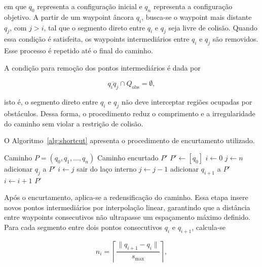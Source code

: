 em que $q_0$ representa a configuração inicial e $q_n$ representa a configuração objetivo. A partir de um waypoint âncora $q_i$, busca-se o waypoint mais distante $q_j$, com $j > i$, tal que o segmento direto entre $q_i$ e $q_j$ seja livre de colisão. Quando essa condição é satisfeita, os waypoints intermediários entre $q_i$ e $q_j$ são removidos. Esse processo é repetido até o final do caminho.

A condição para remoção dos pontos intermediários é dada por

\begin{equation}
    \overline{q_iq_j} \cap Q_{\mathrm{obs}} = \emptyset,
    \label{eq:shortcut_collision_free}
\end{equation}

isto é, o segmento direto entre $q_i$ e $q_j$ não deve interceptar regiões ocupadas por obstáculos. Dessa forma, o procedimento reduz o comprimento e a irregularidade do caminho sem violar a restrição de colisão.

O Algoritmo~\ref{alg:shortcut} apresenta o procedimento de encurtamento utilizado.

\begin{algorithm}[H]
\caption{Encurtamento de caminho por \textit{shortcut}}
\label{alg:shortcut}
\begin{algorithmic}[1]
\Require Caminho $P = (q_0, q_1, \ldots, q_n)$
\Ensure Caminho encurtado $P'$
\State $P' \gets [q_0]$
\State $i \gets 0$
    \State $j \gets n$
            \State adicionar $q_j$ a $P'$
            \State $i \gets j$
            \State sair do laço interno
        \Else
            \State $j \gets j - 1$
        \EndIf
    \EndWhile
        \State adicionar $q_{i+1}$ a $P'$
        \State $i \gets i+1$
    \EndIf
\EndWhile
\State \Return $P'$
\end{algorithmic}
\end{algorithm}

Após o encurtamento, aplica-se a redensificação do caminho. Essa etapa insere novos pontos intermediários por interpolação linear, garantindo que a distância entre waypoints consecutivos não ultrapasse um espaçamento máximo definido. Para cada segmento entre dois pontos consecutivos $q_i$ e $q_{i+1}$, calcula-se

\begin{equation}
    n_i =
    \left\lceil
    \frac{\|q_{i+1} - q_i\|}{s_{\max}}
    \right\rceil,
    \label{eq:densificacao_num_segmentos}
\end{equation}

